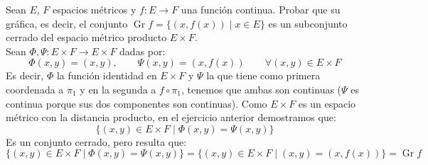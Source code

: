 \begin{ejercicio}
    Sean $E$, $F$ espacios métricos y $f:E\to F$ una función continua. Probar que su gráfica, es decir, el conjunto $\operatorname{Gr} f = \{(x,f(x))\mid x\in E\}$ es un subconjunto cerrado del espacio métrico producto $E \times F$.\\

    \noindent
    Sean $\Phi,\Psi:E\times F \to E\times F$ dadas por:
    \begin{equation*}
        \Phi(x,y) = (x,y), \qquad \Psi(x,y) = (x,f(x)) \qquad \forall (x,y)\in E\times F
    \end{equation*}
    Es decir, $\Phi$ la función identidad en $E\times F$ y $\Psi$ la que tiene como primera coordenada a $\pi_1$ y en la segunda a $f\circ \pi_1$, tenemos que ambas son continuas ($\Psi$ es continua porque sus dos componentes son continuas). Como $E\times F$ es un espacio métrico con la distancia producto, en el ejercicio anterior demostramos que:
    \begin{equation*}
        \{(x,y)\in E\times F \mid \Phi(x,y) = \Psi(x,y)\}
    \end{equation*}
    Es un conjunto cerrado, pero resulta que:
    \begin{equation*}
        \{(x,y)\in E\times F \mid \Phi(x,y) = \Psi(x,y)\} = \{(x,y) \in E\times F \mid (x,y) = (x,f(x))\} = \operatorname{Gr} f
    \end{equation*}
\end{ejercicio}



